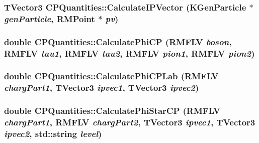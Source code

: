 \label{classCPQuantities_a7cba8aa116e58892d0ecca846e8b8f08}
\hypertarget{classCPQuantities_a6d5ba56501e2c1c35da35309af81b112}{
\subsubsection[{CalculateIPVector}]{\setlength{\rightskip}{0pt plus 5cm}TVector3 CPQuantities::CalculateIPVector (KGenParticle $\ast$ {\em genParticle}, \/  RMPoint $\ast$ {\em pv})}}
\label{classCPQuantities_a6d5ba56501e2c1c35da35309af81b112}
\hypertarget{classCPQuantities_a113b0671c39aba801291753fbe2fb4d8}{
\subsubsection[{CalculatePhiCP}]{\setlength{\rightskip}{0pt plus 5cm}double CPQuantities::CalculatePhiCP (RMFLV {\em boson}, \/  RMFLV {\em tau1}, \/  RMFLV {\em tau2}, \/  RMFLV {\em pion1}, \/  RMFLV {\em pion2})}}
\label{classCPQuantities_a113b0671c39aba801291753fbe2fb4d8}
\hypertarget{classCPQuantities_acff7d59bea15f181b1dfe66c43b49577}{
\subsubsection[{CalculatePhiCPLab}]{\setlength{\rightskip}{0pt plus 5cm}double CPQuantities::CalculatePhiCPLab (RMFLV {\em chargPart1}, \/  TVector3 {\em ipvec1}, \/  TVector3 {\em ipvec2})}}
\label{classCPQuantities_acff7d59bea15f181b1dfe66c43b49577}
\hypertarget{classCPQuantities_ae5788e20756f36ca936b5a9be6df7499}{
\subsubsection[{CalculatePhiStarCP}]{\setlength{\rightskip}{0pt plus 5cm}double CPQuantities::CalculatePhiStarCP (RMFLV {\em chargPart1}, \/  RMFLV {\em chargPart2}, \/  TVector3 {\em ipvec1}, \/  TVector3 {\em ipvec2}, \/  std::string {\em level})}}
\label{classCPQuantities_ae5788e20756f36ca936b5a9be6df7499}
